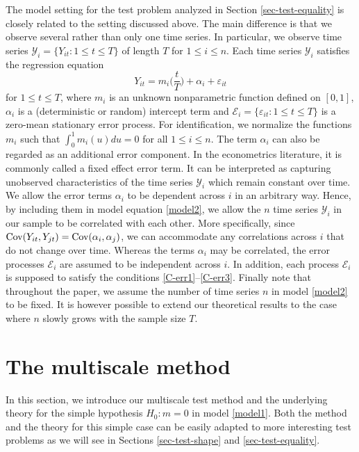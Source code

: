 The model setting for the test problem analyzed in Section \ref{sec-test-equality} is closely related to the setting discussed above. The main difference is that we observe several rather than only one time series. In particular, we observe time series $\mathcal{Y}_i = \{Y_{it}: 1 \le t \le T \}$ of length $T$ for $1 \le i \le n$. Each time series $\mathcal{Y}_i$ satisfies the regression equation \begin{equation}\label{model2}
Y_{it} = m_i \Big( \frac{t}{T} \Big) + \alpha_i + \varepsilon_{it} 
\end{equation}
for $1 \le t \le T$, where $m_i$ is an unknown nonparametric function defined on $[0,1]$, $\alpha_i$ is a (deterministic or random) intercept term and $\mathcal{E}_i = \{ \varepsilon_{it}: 1 \le t \le T \}$ is a zero-mean stationary error process. For identification, we normalize the functions $m_i$ such that $\int_0^1 m_i(u) du = 0$ for all $1 \le i \le n$. The term $\alpha_i$ can also be regarded as an additional error component. In the econometrics literature, it is commonly called a fixed effect error term. It can be interpreted as capturing unobserved characteristics of the time series $\mathcal{Y}_i$ which remain constant over time. We allow the error terms $\alpha_i$ to be dependent across $i$ in an arbitrary way. Hence, by including them in model equation \eqref{model2}, we allow the $n$ time series $\mathcal{Y}_i$ in our sample to be correlated with each other. More specifically, since $\textnormal{Cov}(Y_{it},Y_{jt}) = \textnormal{Cov}(\alpha_i,\alpha_j)$, we can accommodate any correlations across $i$ that do not change over time. Whereas the terms $\alpha_i$ may be correlated, the error processes $\mathcal{E}_i$ are assumed to be independent across $i$. In addition, each process $\mathcal{E}_i$ is supposed to satisfy the conditions \ref{C-err1}--\ref{C-err3}. Finally note that throughout the paper, we assume the number of time series $n$ in model \eqref{model2} to be fixed. It is however possible to extend our theoretical results to the case where $n$ slowly grows with the sample size $T$. 



\section{The multiscale method}\label{sec-method}


In this section, we introduce our multiscale test method and the underlying theory for the simple hypothesis $H_0: m = 0$ in model \eqref{model1}. Both the method and the theory for this simple case can be easily adapted to more interesting test problems as we will see in Sections \ref{sec-test-shape} and \ref{sec-test-equality}. 


